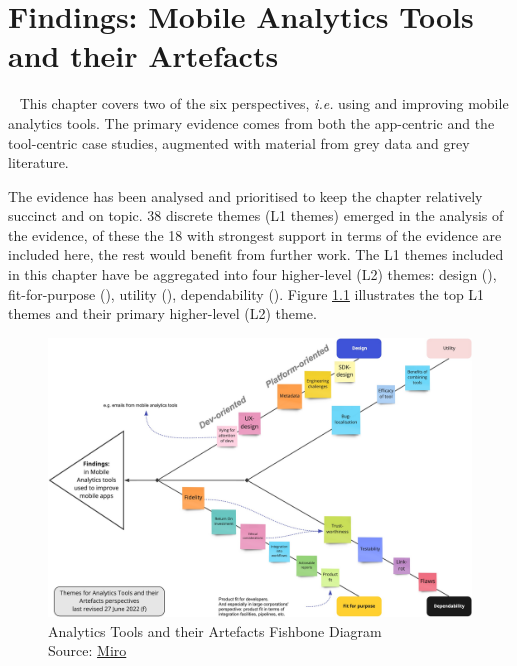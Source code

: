 \setchapterpreamble[u]{\margintoc}
\chapter{Findings: Mobile Analytics Tools and their Artefacts}~\label{chapter-tools-and-their-artefacts}
This chapter covers two of the six perspectives, \emph{i.e.} using and improving mobile analytics tools. The primary evidence comes from both the app-centric and the tool-centric case studies, augmented with material from grey data and grey literature.

The evidence has been analysed and prioritised to keep the chapter relatively succinct and on topic. 38 discrete themes (L1 themes) emerged in the analysis of the evidence, of these the 18 with strongest support in terms of the evidence are included here, the rest would benefit from further work. The L1 themes included in this chapter have be aggregated into four higher-level (L2) themes: design (), fit-for-purpose (), utility (), dependability (). Figure \ref{fig:analytics-tools-and-their-artefacts-fishbone-diagram} illustrates the top L1 themes and their primary higher-level (L2) theme.

\begin{figure}
    \centering
    \includegraphics[width=\linewidth]{images/rough-sketches/analytics-tools-and-their-artefacts-fishbone-diagram-27-jun-2022f.jpeg}
    \caption{Analytics Tools and their Artefacts Fishbone Diagram\\Source: \href{https://miro.com/app/board/uXjVOtIsyWo=/?share_link_id=293061080490}{Miro}}
    \label{fig:analytics-tools-and-their-artefacts-fishbone-diagram}
\end{figure}


